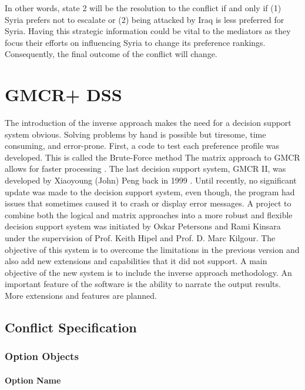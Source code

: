 \documentclass[letterpaper,12pt,titlepage,oneside,final]{book}
\begin{document}
In other words, state 2 will be the resolution to the conflict if and only if (1) Syria prefers not to escalate or (2) being attacked by Iraq is less preferred for Syria. Having this strategic information could be vital to the mediators as they focus their efforts on influencing Syria to change its preference rankings. Consequently, the final outcome of the conflict will change.




\chapter{GMCR+ DSS}

The introduction of the inverse approach makes the need for a decision support system obvious. Solving problems by hand is possible but tiresome, time consuming, and error-prone. First, a code to test each preference profile was developed. This is called the Brute-Force method
The matrix approach to GMCR allows for faster processing \citep{xu2007matrix,xu2009}. The last decision support system, GMCR II, was developed by Xiaoyoung (John) Peng back in 1999 \citep{peng1999decision}. Until recently, no significant update was made to the decision support system, even though, the program had issues that sometimes caused it to crash or display error messages.
A project to combine both the logical and matrix approaches into a more robust and flexible decision support system was initiated by Oskar Petersons and Rami Kinsara under the supervision of Prof. Keith Hipel and Prof. D. Marc Kilgour. The objective of this system is to overcome the limitations in the previous version and also add new extensions and capabilities that it did not support. A main objective of the new system is to include the inverse approach methodology. An important feature of the software is the ability to narrate the output results. More extensions and features are planned.

\section{Conflict Specification}

\subsection{Option Objects}

\subsubsection{Option Name}
\end{document}

